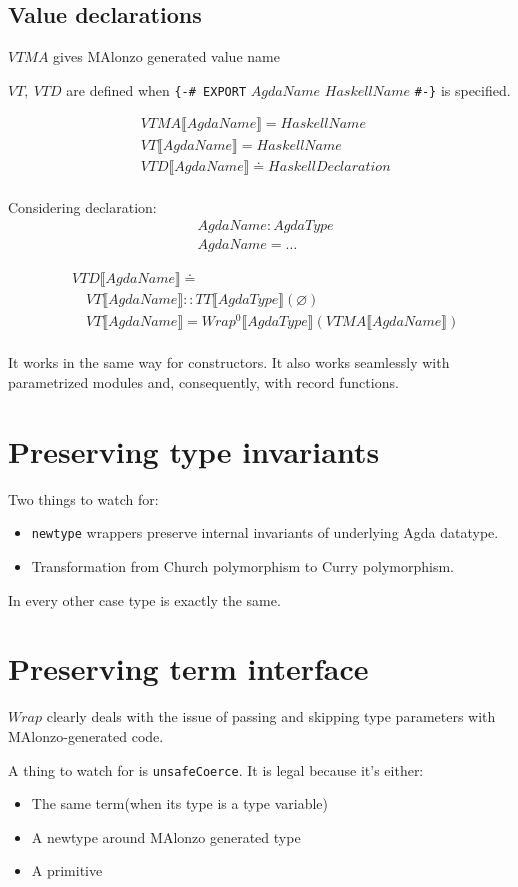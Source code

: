 \subsection{Value declarations}

\(VTMA\) gives MAlonzo generated value name

\(VT,\ VTD\) are defined when \texttt{\{-\# EXPORT} \(AgdaName\) \(HaskellName\) \texttt{\#-\}} is specified.

\begin{align*}
   &VTMA\llbracket AgdaName \rrbracket = HaskellName\\
   &VT\llbracket AgdaName \rrbracket = HaskellName\\
   &VTD\llbracket AgdaName \rrbracket \doteq HaskellDeclaration\\
\end{align*}

Considering declaration:
\begin{align*}
   &AgdaName : AgdaType\\
   &AgdaName = \ldots
\end{align*}

\begin{align*}
   &VTD\llbracket AgdaName \rrbracket \doteq\\
   &\quad VT\llbracket AgdaName \rrbracket :: TT\llbracket AgdaType \rrbracket(\varnothing)\\
   &\quad VT\llbracket AgdaName \rrbracket = Wrap^0\llbracket AgdaType \rrbracket(VTMA\llbracket AgdaName \rrbracket)\\
\end{align*}

It works in the same way for constructors.
It also works seamlessly with parametrized modules and, consequently, with record functions.

\section{Preserving type invariants}

Two things to watch for:
\begin{itemize}
\item \texttt{newtype} wrappers preserve internal invariants of underlying Agda datatype.
\item Transformation from Church polymorphism to Curry polymorphism.
\end{itemize}
In every other case type is exactly the same.

\section{Preserving term interface}

\(Wrap\) clearly deals with the issue of passing and skipping type parameters with
MAlonzo-generated code.

A thing to watch for is \texttt{unsafeCoerce}.
It is legal because it's either:
\begin{itemize}
\item The same term(when its type is a type variable)
\item A newtype around MAlonzo generated type
\item A primitive
\end{itemize}
